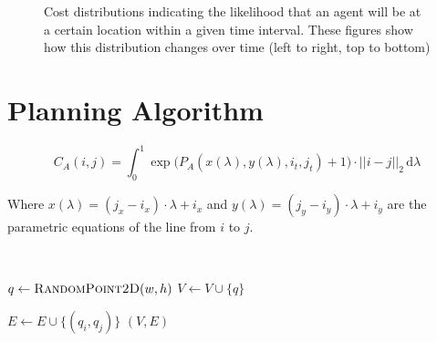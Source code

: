 \begin{figure}[h!]
    \caption{Cost distributions indicating the likelihood that an agent will be
    at a certain location within a given time interval.  These figures show how
this distribution changes over time (left to right, top to bottom)}

    \label{fig:agent_cost}

\end{figure}

\section{Planning Algorithm}


\begin{equation}
    C_A(i, j) = \int^1_0 \exp{\Big(
        P_A(x(\lambda), y(\lambda), i_t, j_t) + 1 \Big)
    } \cdot ||i - j||_{2} \,\mathrm{d}\lambda
    \label{eq:cost}
\end{equation}

Where $x(\lambda) = (j_x - i_x) \cdot \lambda + i_x$ and $y(\lambda) = (j_y -
i_y) \cdot \lambda + i_y$ are the parametric equations of the line from $i$ to
$j$.


\begin{algorithm}[ht]
    \caption{$\Function{Roadmap}(n, d, w, h, O)$}
    \\
    \label{algo:prm}
    \begin{algorithmic}[1]
        \setcounter{ALC@line}{0}
        \vspace*{1mm}

            \STATE $q \leftarrow \Function{RandomPoint2D}(w, h)$
                \STATE $V \leftarrow V \cup \{q\}$
            \ENDIF
        \ENDFOR

                    \STATE $E \leftarrow E \cup \{(q_i, q_j)\}$
                \ENDIF
            \ENDFOR
        \ENDFOR
        \RETURN $(V,E)$
    \end{algorithmic}
\end{algorithm}

